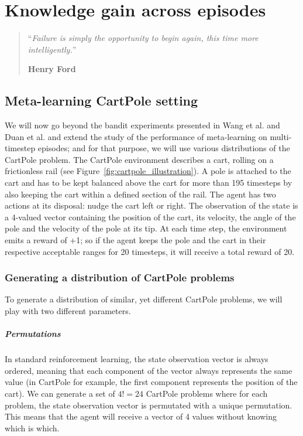\chapter{Knowledge gain across episodes}
\begin{quotation}
\noindent ``\emph{Failure is simply the opportunity to begin again,
	this time more intelligently.}''
\begin{flushright}\textbf{Henry Ford}\end{flushright}
\end{quotation}
\vspace*{0.5cm}

\section{Meta-learning CartPole setting}
\label{sec:setting}
We will now go beyond the bandit experiments presented in Wang et al. 
\cite{learningtorl} and Duan et al. \cite{fastrlviaslowrl} and extend the study 
of the performance of meta-learning on multi-timestep
episodes; and for that purpose, we will use various distributions of 
the CartPole problem. The CartPole environment describes a cart, rolling on 
a frictionless rail (see Figure~\ref{fig:cartpole_illustration}). 
A pole is attached to the cart and has to be kept balanced
above the cart for more than 195 timesteps by also keeping the cart within a 
defined section of the rail. The agent has two actions at its disposal: nudge
the cart left or right. The observation of the state is a 4-valued vector 
containing the position of the cart, its velocity, the angle of the pole and
the velocity of the pole at its tip. At each time step, the environment emits
a reward of +1; so if the agent keeps the pole and the cart in their 
respective acceptable ranges for 20 timesteps, it will receive a total reward
of 20.\\


\subsection{Generating a distribution of CartPole problems}
To generate a distribution of similar, yet different CartPole problems, we
will play with two different parameters.

\paragraph{Permutations} In standard reinforcement learning, the state
observation vector is always ordered, meaning that each component of the vector
always represents the same value (in CartPole for example, the first component
represents the position of the cart). We can generate a set of $4! = 24$
CartPole problems where for each problem, the state observation vector is
permutated with a unique permutation. This means that the agent will
receive a vector of 4 values without knowing which is which.

